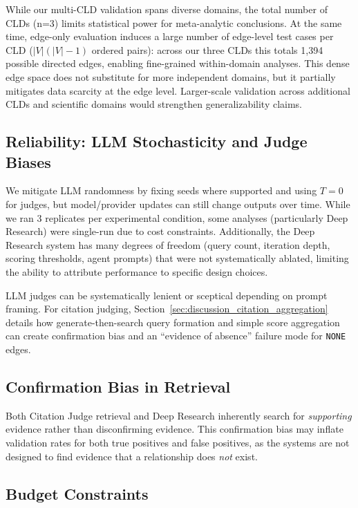 While our multi-CLD validation spans diverse domains, the total number of CLDs (n=3) limits statistical power for meta-analytic conclusions. At the same time, edge-only evaluation induces a large number of edge-level test cases per CLD ($|V|(|V|-1)$ ordered pairs): across our three CLDs this totals 1,394 possible directed edges, enabling fine-grained within-domain analyses. This dense edge space does not substitute for more independent domains, but it partially mitigates data scarcity at the edge level. Larger-scale validation across additional CLDs and scientific domains would strengthen generalizability claims.



\subsection{Reliability: LLM Stochasticity and Judge Biases}

We mitigate LLM randomness by fixing seeds where supported and using $T{=}0$ for judges, but model/provider updates can still change outputs over time. While we ran 3 replicates per experimental condition, some analyses (particularly Deep Research) were single-run due to cost constraints. Additionally, the Deep Research system has many degrees of freedom (query count, iteration depth, scoring thresholds, agent prompts) that were not systematically ablated, limiting the ability to attribute performance to specific design choices.

LLM judges can be systematically lenient or sceptical depending on prompt framing. For citation judging, Section~\ref{sec:discussion_citation_aggregation} details how generate-then-search query formation and simple score aggregation can create confirmation bias and an ``evidence of absence'' failure mode for \texttt{NONE} edges.

\subsection{Confirmation Bias in Retrieval}

Both Citation Judge retrieval and Deep Research 
inherently search for \textit{supporting} 
evidence rather than disconfirming evidence. This 
confirmation bias may inflate validation rates 
for both true positives and false positives, as 
the systems are not designed to find evidence 
that a relationship does \textit{not} exist.

\subsection{Budget Constraints}

